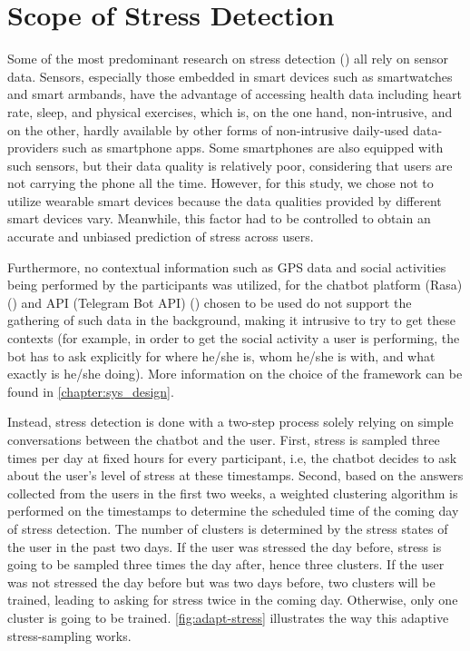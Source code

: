 \section{Scope of Stress Detection} \label{scope_stress_detection}
Some of the most predominant research on stress detection (\cite{7_stress_detection, 8_stress_detection, 9_stress_detection}) all rely on sensor data. Sensors, especially those embedded in smart devices such as smartwatches and smart armbands, have the advantage of accessing health data including heart rate, sleep, and physical exercises, which is, on the one hand, non-intrusive, and on the other, hardly available by other forms of non-intrusive daily-used data-providers such as smartphone apps. Some smartphones are also equipped with such sensors, but their data quality is relatively poor, considering that users are not carrying the phone all the time. However, for this study, we chose not to utilize wearable smart devices because the data qualities provided by different smart devices vary. Meanwhile, this factor had to be controlled to obtain an accurate and unbiased prediction of stress across users.

Furthermore, no contextual information such as GPS data and social activities being performed by the participants was utilized, for the chatbot platform (Rasa) (\cite{10_rasa}) and API (Telegram Bot API) (\cite{11_tg_bot_api}) chosen to be used do not support the gathering of such data in the background, making it intrusive to try to get these contexts (for example, in order to get the social activity a user is performing, the bot has to ask explicitly for where he/she is, whom he/she is with, and what exactly is he/she doing). More information on the choice of the framework can be found in \autoref{chapter:sys_design}. \bigskip

Instead, stress detection is done with a two-step process solely relying on simple conversations between the chatbot and the user. First, stress is sampled three times per day at fixed hours for every participant, i.e, the chatbot decides to ask about the user’s level of stress at these timestamps. Second, based on the answers collected from the users in the first two weeks, a weighted clustering algorithm is performed on the timestamps to determine the scheduled time of the coming day of stress detection. The number of clusters is determined by the stress states of the user in the past two days. If the user was stressed the day before, stress is going to be sampled three times the day after, hence three clusters. If the user was not stressed the day before but was two days before, two clusters will be trained, leading to asking for stress twice in the coming day. Otherwise, only one cluster is going to be trained. \autoref{fig:adapt-stress} illustrates the way this adaptive stress-sampling works.

